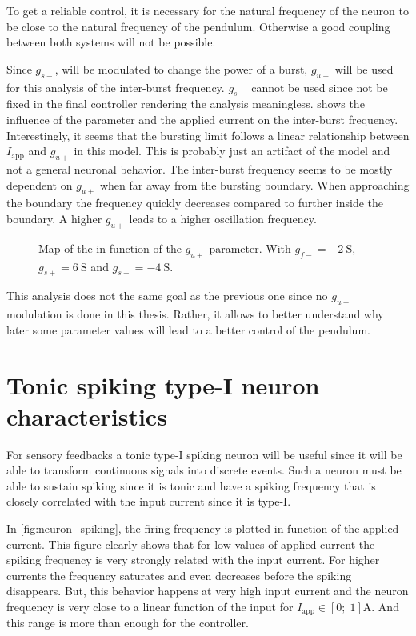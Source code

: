 To get a reliable control, it is necessary for the natural frequency of the neuron to be close to the natural frequency of the pendulum.
Otherwise a good coupling between both systems will not be possible.

Since $g_{s-}$, will be modulated to change the power of a burst, $g_{u+}$ will be used for this analysis of the inter-burst frequency.
$g_{s-}$ cannot be used since not be fixed in the final controller rendering the analysis meaningless.
 shows the influence of the parameter and the applied current on the inter-burst frequency. 
Interestingly, it seems that the bursting limit follows a linear relationship between $I_\text{app}$ and $g_{u+}$ in this model. 
This is probably just an artifact of the model and not a general neuronal behavior.
The inter-burst frequency seems to be mostly dependent on $g_{u+}$ when far away from the bursting boundary.
When approaching the boundary the frequency quickly decreases compared to further inside the boundary.
A higher $g_{u+}$ leads to a higher oscillation frequency.

\begin{figure}[!htb]
    \centering
    \caption{Map of the  in function of the $g_{u+}$ parameter. With $g_{f-} = \qty{-2}{\siemens}$, $g_{s+} = \qty{6}{\siemens}$ and $g_{s-} = \qty{-4}{\siemens}$.}
    \label{fig:neuron_burst_freq}
\end{figure}

This analysis does not the same goal as the previous one since no $g_{u+}$ modulation is done in this thesis. 
Rather, it allows to better understand why later some parameter values will lead to a better control of the pendulum.

\section{Tonic spiking type-I neuron characteristics}

For sensory feedbacks a tonic type-I spiking neuron will be useful since it will be able to transform continuous signals into discrete events.
Such a neuron must be able to sustain spiking since it is tonic and have a spiking frequency that is closely correlated with the input current since it is type-I.

In \cref{fig:neuron_spiking}, the firing frequency is plotted in function of the applied current. 
This figure clearly shows that for low values of applied current the spiking frequency is very strongly related with the input current. 
For higher currents the frequency saturates and even decreases before the spiking disappears.
But, this behavior happens at very high input current and the neuron frequency is very close to a linear function of the input for $I_\text{app} \in \left[0;\;1\right]\unit{\ampere}$.
And this range is more than enough for the controller.

